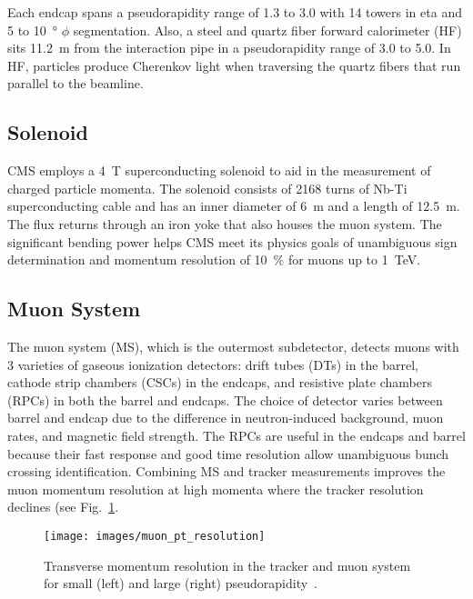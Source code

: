 \documentclass[12pt]{article}
\begin{document}
        Each endcap spans a pseudorapidity range of \num{1.3} to \num{3.0} with \num{14} towers in eta and \num{5} to \SI{10}{\degree} $\phi$ segmentation. Also, a steel and quartz fiber forward calorimeter (HF) sits \SI{11.2}{m} from the interaction pipe in a pseudorapidity range of \num{3.0} to \num{5.0}. In HF, particles produce Cherenkov light when traversing the quartz fibers that run parallel to the beamline.

    \subsection{Solenoid}
        CMS employs a \SI{4}{T} superconducting solenoid to aid in the measurement of charged particle momenta. The solenoid consists of \num{2168} turns of Nb-Ti superconducting cable and has an inner diameter of \SI{6}{m} and a length of \SI{12.5}{m}. The flux returns through an iron yoke that also houses the muon system. The significant  bending power helps CMS meet its physics goals of unambiguous sign determination and momentum resolution of \SI{10}{\percent} for muons up to \SI{1}{\tera\electronvolt}\cite{cms_experiment}.

    \subsection{Muon System}
        The muon system (MS), which is the outermost subdetector, detects muons with \num{3} varieties of gaseous ionization detectors: drift tubes (DTs) in the barrel, cathode strip chambers (CSCs) in the endcaps, and resistive plate chambers (RPCs) in both the barrel and endcaps. The choice of detector varies between barrel and endcap due to the difference in neutron-induced background, muon rates, and magnetic field strength. The RPCs are useful in the endcaps and barrel because their fast response and good time resolution allow unambiguous bunch crossing identification. Combining MS and tracker measurements improves the muon momentum resolution at high momenta where the tracker resolution declines (see Fig.~\ref{muon_pt_resolution}\cite{cms_experiment, cms_tdr}.

        \noindent \begin{figure}[htbp] \begin{center}
        \texttt{[image: images/muon\_pt\_resolution]}
        \caption{Transverse momentum resolution in the tracker and muon system for small (left) and large (right) pseudorapidity~\cite{cms_image}.}
        \label{muon_pt_resolution}
        \end{center} \end{figure}
\end{document}
